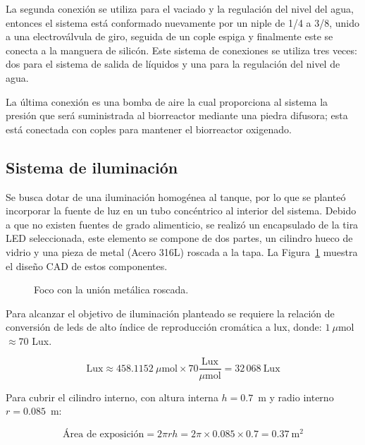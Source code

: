 \documentclass[11pt,tesis,twoside,openright,spanish]{upiiztt}
\begin{document}
La segunda conexión se utiliza para el vaciado y la regulación del nivel del agua,
entonces el sistema está conformado nuevamente por un niple de 1/4 a 3/8, unido
a una electroválvula de giro, seguida de un cople espiga y finalmente este se
conecta a la manguera de silicón. Este sistema de conexiones se utiliza tres veces:
dos para el sistema de salida de líquidos y una para la regulación del nivel de agua.

La última conexión es una bomba de aire la cual proporciona al sistema la presión
que será suministrada al biorreactor mediante una piedra difusora; esta está
conectada con coples para mantener el biorreactor oxigenado.

\subsection{Sistema de iluminación}

Se busca dotar de una iluminación homogénea al tanque, por lo que se planteó
incorporar la fuente de luz en un tubo concéntrico al interior del sistema. Debido a
que no existen fuentes de grado alimenticio, se realizó un encapsulado de la tira
LED seleccionada, este elemento se compone de dos partes, un cilindro hueco de
vidrio y una pieza de metal (Acero 316L) roscada a la tapa. La Figura~\ref{fig:foco_union} muestra el
diseño CAD de estos componentes.

\begin{figure}[H]
  \centering
  \caption{Foco con la unión metálica roscada.}
  \label{fig:foco_union}
\end{figure}

Para alcanzar el objetivo de iluminación planteado se requiere la relación de
conversión de leds de alto índice de reproducción cromática a lux, donde:
$1\ \mu$mol $\approx 70$ Lux.

\begin{equation}
\text{Lux} \approx 458.1152\ \mu\text{mol} \times 70 \frac{\text{Lux}}{\mu\text{mol}} = 32\,068\ \text{Lux}
\end{equation}

Para cubrir el cilindro interno, con altura interna $h = 0.7$~m y radio interno $r = 0.085$~m:

\begin{equation}
\text{Área de exposición} = 2\pi r h = 2\pi \times 0.085 \times 0.7 = 0.37\ \text{m}^2
\end{equation}
\end{document}
